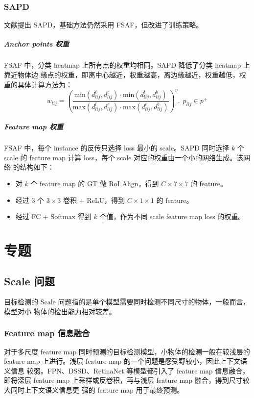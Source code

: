 \subsection{SAPD}
文献提出 SAPD，基础方法仍然采用 FSAF，但改进了训练策略。

\paragraph{Anchor points 权重}
FSAF 中，分类 heatmap 上所有点的权重均相同。SAPD 降低了分类 heatmap 上靠近物体边
缘点的权重，即离中心越近，权重越高，离边缘越近，权重越低，权重的具体计算方法为：
\begin{equation}
  w_{lij} = \left( \frac{\mathrm{min} \left( d_{lij}^l, d_{lij}^r \right) \cdot \mathrm{min} \left( d_{lij}^t, d_{lij}^b \right)}{\mathrm{max} \left( d_{lij}^l, d_{lij}^r \right) \cdot \mathrm{max} \left( d_{lij}^t, d_{lij}^b \right)} \right)^{\eta}, \; p_{lij} \in p^+
\end{equation}

\paragraph{Feature map 权重}
FSAF 中，每个 instance 的反传只选择 loss 最小的 scale。SAPD 同时选择 $k$ 个
scale 的 feature map 计算 loss，每个 scale 对应的权重由一个小的网络生成。该网络
的结构如下：
\begin{itemize}
  \item 对 $k$ 个 feature map 的 GT 做 RoI Align，得到 $C \times 7 \times 7$ 的 feature。
  \item 经过 3 个 $3 \times 3$ 卷积 + ReLU，得到 $C \times 1 \times 1$ 的 feature。
  \item 经过 FC + Softmax 得到 $k$ 个值，作为不同 scale feature map loss 的权重。
\end{itemize}

\chapter{专题}
\section{Scale 问题}
目标检测的 Scale 问题指的是单个模型需要同时检测不同尺寸的物体，一般而言，模型对小
物体的检出能力相对较差。

\subsection{Feature map 信息融合}
对于多尺度 feature map 同时预测的目标检测模型，小物体的检测一般在较浅层的
feature map 上进行。浅层 feature map 的一个问题是感受野较小，因此上下文语义信息
较弱。FPN、DSSD、RetinaNet 等模型都引入了 feature map 信息融合，即将深层 feature
map 上采样或反卷积，再与浅层 feature map 融合，得到尺寸较大同时上下文语义信息更
强的 feature map 用于最终预测。

